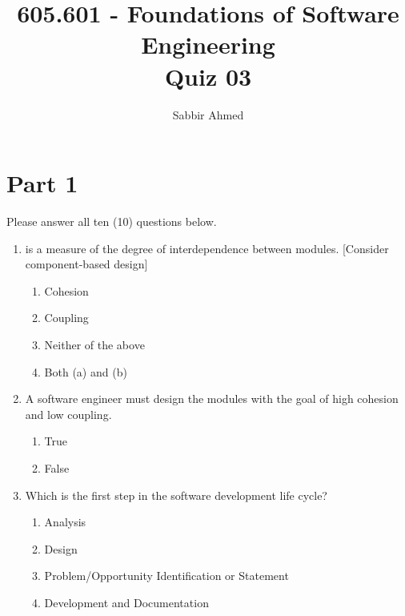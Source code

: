 \documentclass[12pt]{article}
\newcommand{\perhapsanswer}{%
  \ifanswer
    $\blacksquare$ \global\answerfalse
  \else
    $\square$ \global\answerfalse
  \fi
}
\newif\ifanswer
\begin{document}
  \title{605.601 - Foundations of Software Engineering \\ Quiz 03\vspace{-0.5em}}
  \author{Sabbir Ahmed}
  \maketitle
  \vspace{-1em}

  \section*{Part 1} Please answer all ten (10) questions below.

  \begin{enumerate}

    \item \underline{\phantom{Neither of the above}} is a measure of the degree of interdependence between modules. [Consider component-based design]
    \begin{enumerate}[start=1,align=left,label={\protect\perhapsanswer(\alph*)}]
      \item Cohesion
      \item Coupling
      \item Neither of the above
      \item Both (a) and (b)
    \end{enumerate}

    \item A software engineer must design the modules with the goal of high cohesion and low coupling.
    \begin{enumerate}[start=1,align=left,label={\protect\perhapsanswer(\alph*)}]
      \item True
      \item False
    \end{enumerate}

    \item Which is the first step in the software development life cycle?
    \begin{enumerate}[start=1,align=left,label={\protect\perhapsanswer(\alph*)}]
      \item Analysis
      \item Design
      \item Problem/Opportunity Identification or Statement
      \item Development and Documentation
    \end{enumerate}


\end{enumerate}
\end{document}
